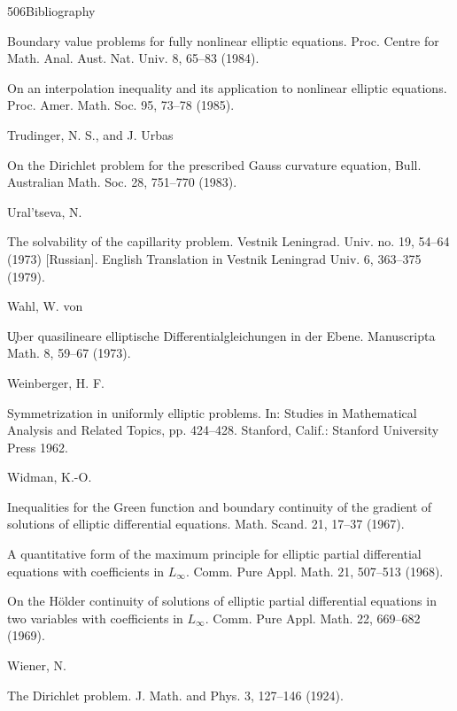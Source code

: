 \begin{center}
506\hfill Bibliography
\end{center}

\noindent [TR 14]\quad Boundary value problems for fully nonlinear elliptic equations. Proc. Centre for Math. Anal. Aust. Nat. Univ. 8, 65--83 (1984).

\noindent [TR 15]\quad On an interpolation inequality and its application to nonlinear elliptic equations. Proc. Amer. Math. Soc. 95, 73--78 (1985).

\noindent Trudinger, N. S., and J. Urbas

\noindent [TU]\quad On the Dirichlet problem for the prescribed Gauss curvature equation, Bull. Australian Math. Soc. 28, 751--770 (1983).

\noindent Ural'tseva, N.

\noindent [UR]\quad The solvability of the capillarity problem. Vestnik Leningrad. Univ. no. 19, 54--64 (1973) [Russian]. English Translation in Vestnik Leningrad Univ. 6, 363--375 (1979).

\noindent Wahl, W. von

\noindent [WA]\quad \c{U}ber quasilineare elliptische Differentialgleichungen in der Ebene. Manuscripta Math. 8, 59--67 (1973).

\noindent Weinberger, H. F.

\noindent [WE]\quad Symmetrization in uniformly elliptic problems. In: Studies in Mathematical Analysis and Related Topics, pp. 424--428. Stanford, Calif.: Stanford University Press 1962.

\noindent Widman, K.-O.

\noindent [WI 1]\quad Inequalities for the Green function and boundary continuity of the gradient of solutions of elliptic differential equations. Math. Scand. 21, 17--37 (1967).

\noindent [WI 2]\quad A quantitative form of the maximum principle for elliptic partial differential equations with coefficients in $L_\infty$. Comm. Pure Appl. Math. 21, 507--513 (1968).

\noindent [WI 3]\quad On the H\"older continuity of solutions of elliptic partial differential equations in two variables with coefficients in $L_\infty$. Comm. Pure Appl. Math. 22, 669--682 (1969).

\noindent Wiener, N.

\noindent [WN]\quad The Dirichlet problem. J. Math. and Phys. 3, 127--146 (1924).

